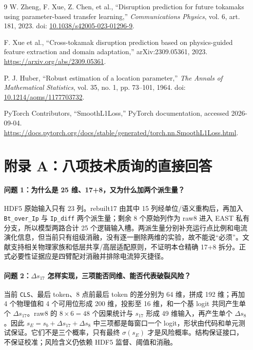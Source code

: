 \documentclass[11pt,a4paper]{article}
\newcommand{\code}[1]{\texttt{\small #1}}
\begin{document}
\begin{thebibliography}{9}
W. Zheng, F. Xue, Z. Chen, et al.,
``Disruption prediction for future tokamaks using parameter-based transfer learning,''
\emph{Communications Physics}, vol. 6, art. 181, 2023.
doi: \href{https://doi.org/10.1038/s42005-023-01296-9}{10.1038/s42005-023-01296-9}.

F. Xue et al.,
``Cross-tokamak disruption prediction based on physics-guided feature extraction and domain adaptation,''
arXiv:2309.05361, 2023.
\url{https://arxiv.org/abs/2309.05361}.

P. J. Huber,
``Robust estimation of a location parameter,''
\emph{The Annals of Mathematical Statistics}, vol. 35, no. 1, pp. 73--101, 1964.
doi: \href{https://doi.org/10.1214/aoms/1177703732}{10.1214/aoms/1177703732}.

PyTorch Contributors,
``SmoothL1Loss,'' PyTorch documentation, accessed 2026-09-04.
\url{https://docs.pytorch.org/docs/stable/generated/torch.nn.SmoothL1Loss.html}.
\end{thebibliography}

\section*{附录 A：八项技术质询的直接回答}

\paragraph{问题 1：为什么是 25 维、17+8，又为什么加两个派生量？}
HDF5 原始输入只有 23 列。rebuilt17 由其中 15 列经单位/语义重构后，再加入 \code{Bt\_over\_Ip} 与 \code{Ip\_diff} 两个派生量；剩余 8 个原始列作为 raw8 进入 EAST 私有分支，所以模型两路合计 25 个逻辑输入槽。两派生量分别补充运行点比例和电流演化信息，但当前只有组级消融，没有逐一删除两维的实验，故不能说“必须”。文献支持相关物理家族和低层共享/高层适配原则，不证明本仓精确 17+8 拆分。正式必要性证据应是四臂配对消融并排除电流猝灭捷径。

\paragraph{问题 2：\(\Delta s_{17}\) 怎样实现，三项能否同维、能否代表破裂风险？}
当前 \code{CLS}、最后 token、8 点前最后 token 的差分别为 64 维，拼成 192 维；再加 4 个物理值和 4 个可用位形成 200 维，投影至 16 维，和一个基 logit 共同产生单个 \(\Delta s_{17}\)。raw8 的 \(8\times6=48\) 个因果统计与 \(s_{17}\) 形成 49 维输入，再产生单个 \(\Delta s_8\)。因此 \(s_E=s_b+\Delta s_{17}+\Delta s_8\) 中三项都是每窗口一个 logit，形状由代码和单元测试保证。它们不是三个概率，只有最终 \(\sigma(s_E)\) 才是风险概率。结构保证接口，不保证校准；风险含义仍依赖 HDF5 监督、阈值和消融。
\end{document}
